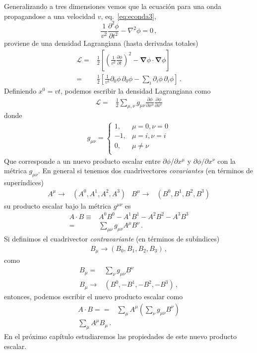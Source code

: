 Generalizando a tres dimensiones vemos que la ecuaci\'on para una onda propagandose a una velocidad $v$, eq.~\eqref{eq:econda3},  
\begin{equation}
     \frac{1}{v^2}\frac{\partial^2\phi}{\partial t^2}-\nabla^2\phi=0\,,
\end{equation}
proviene de una densidad Lagrangiana (hasta derivadas totales)
\begin{align}
    \label{eq:ls3d}
    \mathcal{L}=&\frac{1}{2}\left[
  \left(
\frac{1}{v^2}\frac{\partial\phi}{\partial t}
  \right)^2-\boldsymbol{\nabla}\phi\cdot\boldsymbol{\nabla}\phi \right]\nonumber\\
    =&\frac{1}{2}\left[
      \frac{1}{v^2}{\partial_0\phi}\,{\partial_0\phi}-\sum_i{\partial_i\phi}\,{\partial_i\phi}
   \right]\,.
\end{align}
Definiendo $x^0=vt$, podemos escribir la densidad Lagrangiana como
\begin{align}
   \mathcal{L}=&\frac{1}{2}\sum_{\mu,\nu}g_{\mu\nu}\frac{\partial\phi}{\partial x^{\mu}}\frac{\partial\phi}{\partial x^{\nu}}
\end{align}
donde
\begin{align}
  g_{\mu\nu}=
  \begin{cases}
    1, & \mu=0,\nu=0\\
    -1, & \mu=i,\nu=i\\
    0, & \mu\ne\nu\\
  \end{cases}
\end{align}
Que corresponde a un nuevo producto escalar entre $\partial\phi/\partial x^{\mu}$ y $\partial\phi/\partial x^{\nu}$ con la métrica $g_{\mu\nu}$. En general si tenemos dos cuadrivectores \emph{covariantes} (en términos de superíndices)
\begin{align}
\label{eq:covariante}
  A^{\mu}\to &\left(A^0,A^1,A^2,A^3  \right) & B^{\mu}\to &\left(B^0,B^1,B^2,B^3  \right)
\end{align}
su producto escalar bajo la métrica $g^{\mu\nu}$ es
\begin{align}
  A\cdot B\equiv &A^0 B^0-A^1B^1-A^2B^2-A^3B^3 \nonumber\\
 =&\sum_{\mu\nu} g_{\mu\nu}A^{\mu} B^{\nu}\,.
\end{align}
Si definimos el cuadrivector \emph{contravariante} (en términos de subíndices)
\begin{align}
  B_{\mu}\to \left( B_0,B_1,B_2,B_3 \right)\,,
\end{align}
como
\begin{align}
  \label{eq:contravariante}
  B_{\mu}=&\sum_{\nu} g_{\mu\nu}B^{\nu}\nonumber\\
  B_{\mu}\to& \left(B^0,-B^1,-B^2,-B^3\right)\,,
\end{align}
entonces, podemos escribir el nuevo producto escalar como
\begin{align}
  A\cdot B==&\sum_{\mu} A^{\mu}\left( \sum_{\nu} g_{\mu\nu} B^{\nu} \right)\nonumber\\
\sum_{\mu} A^{\mu}B_{\mu}\,.
\end{align}
En el próximo capítulo estudiaremos las propiedades de este nuevo producto escalar.
 

